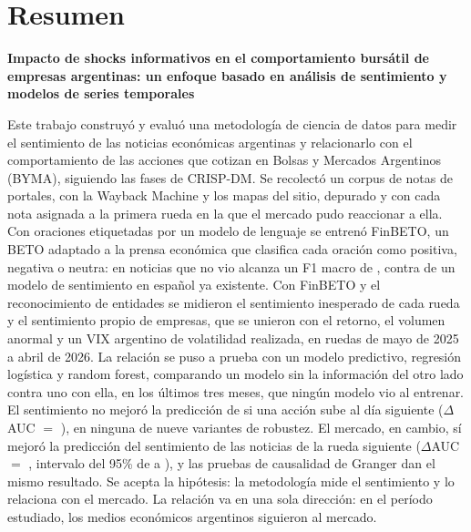 \documentclass[11pt,a4paper,oneside]{report}
\begin{document}
\chapter*{Resumen}
\begin{center}
  {\titulos\large\bfseries Impacto de shocks informativos en el comportamiento bursátil de
  empresas argentinas: un enfoque basado en análisis de sentimiento y modelos de series
  temporales\par}
\end{center}
\vspace{4pt}

Este trabajo construyó y evaluó una metodología de ciencia de datos para medir el sentimiento de
las noticias económicas argentinas y relacionarlo con el comportamiento de las acciones que cotizan
en Bolsas y Mercados Argentinos (BYMA), siguiendo las fases de CRISP-DM. Se recolectó un corpus de
 notas de  portales, con la Wayback Machine y los mapas del
sitio, depurado y con cada nota asignada a la primera rueda en la que el mercado pudo reaccionar a
ella. Con oraciones etiquetadas por un modelo de lenguaje se entrenó FinBETO, un BETO adaptado a la
prensa económica que clasifica cada oración como positiva, negativa o neutra: en noticias que no vio
alcanza un F1 macro de , contra 
de un modelo de sentimiento en español ya existente. Con FinBETO y el reconocimiento de entidades se
midieron el sentimiento inesperado de cada rueda y el sentimiento propio de 
empresas, que se unieron con el retorno, el volumen anormal y un VIX argentino de volatilidad
realizada, en  ruedas de mayo de 2025 a abril de 2026. La relación se puso a
prueba con un modelo predictivo, regresión logística y random forest, comparando un modelo sin la
información del otro lado contra uno con ella, en los últimos tres meses, que ningún modelo vio al
entrenar. El sentimiento no mejoró la predicción de si una acción sube al día siguiente
($\Delta$AUC $=$ ), en ninguna de nueve variantes de robustez. El
mercado, en cambio, sí mejoró la predicción del sentimiento de las noticias de la rueda siguiente
($\Delta$AUC $=$ , intervalo del 95\% de
 a ), y las pruebas de causalidad
de Granger dan el mismo resultado. Se acepta la hipótesis: la metodología mide el sentimiento y lo
relaciona con el mercado. La relación va en una sola dirección: en el período estudiado, los medios
económicos argentinos siguieron al mercado.
\end{document}
